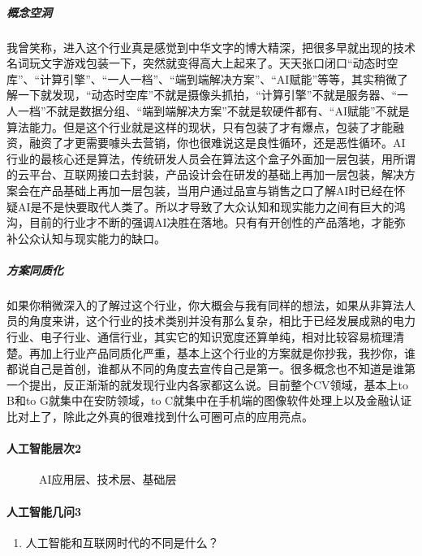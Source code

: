 \documentclass[letterpaper,11pt,english]{sphinxmanual}
\begin{document}
\subparagraph{概念空洞}
\label{\detokenize{chapter_introduction/AI:id6}}
我曾笑称，进入这个行业真是感觉到中华文字的博大精深，把很多早就出现的技术名词玩文字游戏包装一下，突然就变得高大上起来了。天天张口闭口“动态时空库”、“计算引擎”、“一人一档”、“端到端解决方案”、“AI赋能”等等，其实稍微了解一下就发现，“动态时空库”不就是摄像头抓拍，“计算引擎”不就是服务器、“一人一档”不就是数据分组、“端到端解决方案”不就是软硬件都有、“AI赋能”不就是算法能力。但是这个行业就是这样的现状，只有包装了才有爆点，包装了才能融资，融资了才更需要噱头去营销，你也很难说这是良性循环，还是恶性循环。AI行业的最核心还是算法，传统研发人员会在算法这个盒子外面加一层包装，用所谓的云平台、互联网接口去封装，产品设计会在研发的基础上再加一层包装，解决方案会在产品基础上再加一层包装，当用户通过品宣与销售之口了解AI时已经在怀疑AI是不是快要取代人类了。所以才导致了大众认知和现实能力之间有巨大的鸿沟，目前的行业才不断的强调AI决胜在落地。只有有开创性的产品落地，才能弥补公众认知与现实能力的缺口。


\subparagraph{方案同质化}
\label{\detokenize{chapter_introduction/AI:id7}}
如果你稍微深入的了解过这个行业，你大概会与我有同样的想法，如果从非算法人员的角度来讲，这个行业的技术类别并没有那么复杂，相比于已经发展成熟的电力行业、电子行业、通信行业，其实它的知识宽度还算单纯，相对比较容易梳理清楚。再加上行业产品同质化严重，基本上这个行业的方案就是你抄我，我抄你，谁都说自己是首创，谁都从不同的角度去宣传自己是第一。很多概念也不知道是谁第一个提出，反正渐渐的就发现行业内各家都这么说。目前整个CV领域，基本上to
B和to G就集中在安防领域，to
C就集中在手机端的图像软件处理上以及金融认证比对上了，除此之外真的很难找到什么可圈可点的应用亮点。


\paragraph{人工智能层次2\sphinxfootnotemark[68]}
\label{\detokenize{chapter_introduction/AI:id8}}%
\begin{footnotetext}[68]\sphinxAtStartFootnote
{}
%
\end{footnotetext}\ignorespaces 
\begin{figure}[H]
\centering
\capstart

\noindent{}
\caption{AI应用层、技术层、基础层}\label{\detokenize{chapter_introduction/AI:id12}}\end{figure}


\paragraph{人工智能几问3\sphinxfootnotemark[69]}
\label{\detokenize{chapter_introduction/AI:id9}}%
\begin{footnotetext}[69]\sphinxAtStartFootnote
{}
%
\end{footnotetext}\ignorespaces \begin{enumerate}
%
\item {} 
人工智能和互联网时代的不同是什么？

\end{enumerate}
\end{document}
